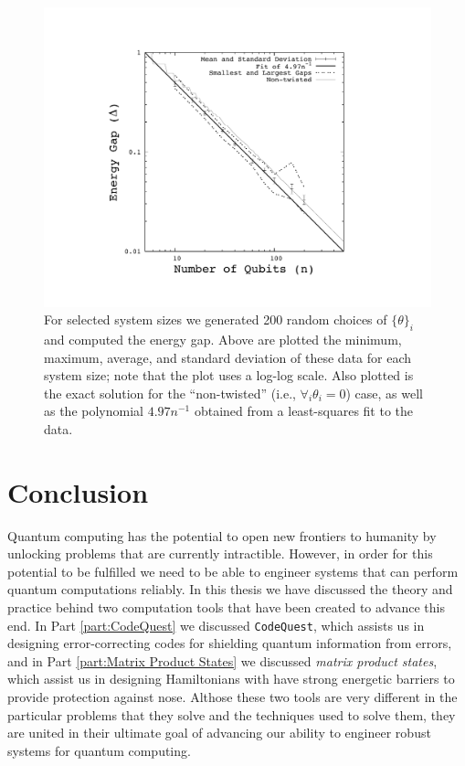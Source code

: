 \documentclass[12pt]{amsbook}
\theoremstyle{plain}
\theoremstyle{definition}
\theoremstyle{remark}
\begin{document}
\begin{figure}
\includegraphics[width=\columnwidth]{images/qtrans}
\caption{
\label{plot:qtrans}
For selected system sizes we generated 200 random choices of $\{\theta\}_i$ and computed the energy gap.  Above are plotted the minimum, maximum, average, and standard deviation of these data for each system size;  note that the plot uses a log-log scale.  Also plotted is the exact solution for the ``non-twisted'' (i.e., $\forall_i\theta_i=0$) case, as well as the polynomial $4.97n^{-1}$ obtained from a least-squares fit to the data.}
\end{figure}
\part{Conclusion}

Quantum computing has the potential to open new frontiers to humanity by unlocking problems that are currently intractible.  However, in order for this potential to be fulfilled we need to be able to engineer systems that can perform quantum computations reliably.  In this thesis we have discussed the theory and practice behind two computation tools that have been created to advance this end.  In Part \ref{part:CodeQuest} we discussed \texttt{CodeQuest}, which assists us in designing error-correcting codes for shielding quantum information from errors, and in Part \ref{part:Matrix Product States} we discussed \emph{matrix product states}, which assist us in designing Hamiltonians with have strong energetic barriers to provide protection against nose.  Althose these two tools are very different in the particular problems that they solve and the techniques used to solve them, they are united in their ultimate goal of advancing our ability to engineer robust systems for quantum computing.
\end{document}
